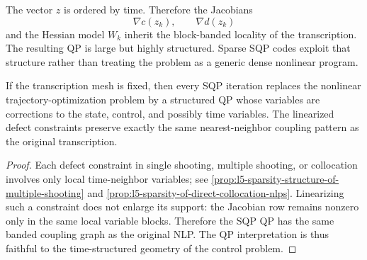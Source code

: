 \begin{remark}
	The vector $z$ is ordered by time. Therefore the Jacobians
	\[
		\nabla c(z_k),
		\qquad
		\nabla d(z_k)
	\]
	and the Hessian model $W_k$ inherit the block-banded locality of the transcription. The resulting QP is large but highly structured. Sparse SQP codes exploit that structure rather than treating the problem as a generic dense nonlinear program.
\end{remark}

\begin{proposition}\label{prop:l5-why-sqp-is-a-natural-solver-for-direct-transcription}
	If the transcription mesh is fixed, then every SQP iteration replaces the nonlinear trajectory-optimization problem by a structured QP whose variables are corrections to the state, control, and possibly time variables. The linearized defect constraints preserve exactly the same nearest-neighbor coupling pattern as the original transcription.
\end{proposition}
\begin{proof}
	Each defect constraint in single shooting, multiple shooting, or collocation involves only local time-neighbor variables; see \autoref{prop:l5-sparsity-structure-of-multiple-shooting} and \autoref{prop:l5-sparsity-of-direct-collocation-nlps}. Linearizing such a constraint does not enlarge its support: the Jacobian row remains nonzero only in the same local variable blocks. Therefore the SQP QP has the same banded coupling graph as the original NLP. The QP interpretation is thus faithful to the time-structured geometry of the control problem.
\end{proof}

\begin{algorithm}[H]
	\DontPrintSemicolon
	\caption{SQP for a Transcribed Trajectory-Optimization NLP}
\label{alg:l5-sqp-for-a-transcribed-trajectory-optimization-nlp}
\end{algorithm}

